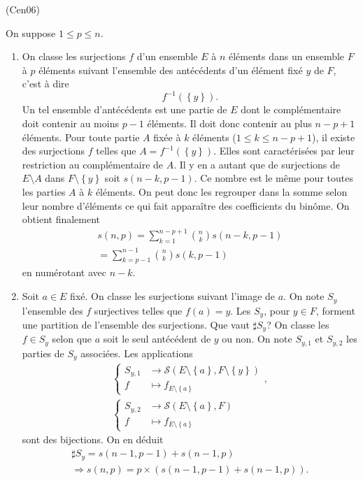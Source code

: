 \begin{tiny}(Cen06)\end{tiny} On suppose $1\leq p\leq n$. 
\begin{enumerate}
  \item On classe les surjections $f$ d'un ensemble $E$ à $n$ éléments dans un ensemble $F$ à $p$ éléments suivant l'ensemble des antécédents d'un élément fixé $y$ de $F$, c'est à dire 
\[
  f^{-1}(\left\lbrace y\right\rbrace).
\]
Un tel ensemble d'antécédents est une partie de $E$ dont le complémentaire doit contenir au moins $p-1$ éléments. Il doit donc contenir au plus $n-p+1$ éléments.\newline
Pour toute partie $A$ fixée à $k$ éléments ($1 \leq k\leq n-p+1$), il existe des surjections $f$ telles que $ A= f^{-1}(\left\lbrace y\right\rbrace)$. Elles sont caractérisées par leur restriction au complémentaire de $A$. Il y en a autant que de surjections de $E\setminus A$ dans $F\setminus\left\lbrace y \right\rbrace$ soit $s(n-k,p-1)$.\newline
Ce nombre est le même pour toutes les parties $A$ à $k$ éléments. On peut donc les regrouper dans la somme selon leur nombre d'éléments ce qui fait apparaître des coefficients du binôme. On obtient finalement
\begin{multline*}
  s(n,p) = \sum_{k=1}^{n-p+1}\binom{n}{k}s(n-k,p-1) \\
  = \sum_{k=p-1}^{n-1}\binom{n}{k}s(k,p-1)
\end{multline*}
en numérotant avec $n-k$.
  \item Soit $a \in E$ fixé. On classe les surjections suivant l'image de $a$. On note $S_y$ l'ensemble des $f$ surjectives telles que $f(a) = y$. Les $S_y$, pour $y\in F$, forment une partition de l'ensemble des surjections. Que vaut $\sharp S_y$?\medskip \newline
  On classe les $f \in S_y$ selon que $a$ soit le seul antécédent de $y$ ou non. On note $S_{y,1}$ et $S_{y,2}$ les parties de $S_y$ associées.\newline
  Les applications
\begin{multline*}
  \left\lbrace
  \begin{aligned}
    S_{y, 1} &\rightarrow \mathcal{S}(E\setminus \left\lbrace a \right\rbrace, F\setminus \left\lbrace y \right\rbrace)\\
    f &\mapsto f_{E\setminus \left\lbrace a \right\rbrace}
  \end{aligned}
   \right., \\
  \left\lbrace
  \begin{aligned}
    S_{y, 2} &\rightarrow \mathcal{S}(E\setminus \left\lbrace a \right\rbrace, F)\\
    f &\mapsto f_{E\setminus \left\lbrace a \right\rbrace}
  \end{aligned}
   \right.
\end{multline*}
sont des bijections. On en déduit 
\begin{multline*}
  \sharp S_y = s(n-1,p-1) + s(n-1,p)\\
  \Rightarrow s(n,p) = p \times\left(s(n-1,p-1) + s(n-1,p)\right).
\end{multline*}


\end{enumerate}


